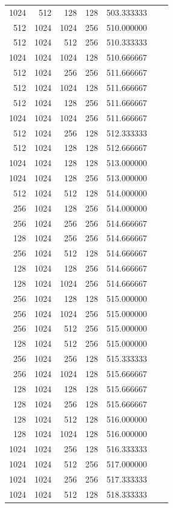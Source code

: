 \documentclass{article}
\begin{document}
{\begin{longtable}{rrrrrrr}
1024 & 512 & 128 & 128 & 503.333333 \\
512 & 1024 & 1024 & 256 & 510.000000 \\
512 & 1024 & 512 & 256 & 510.333333 \\
1024 & 1024 & 1024 & 128 & 510.666667 \\
512 & 1024 & 256 & 256 & 511.666667 \\
512 & 1024 & 1024 & 128 & 511.666667 \\
512 & 1024 & 128 & 256 & 511.666667 \\
1024 & 1024 & 1024 & 256 & 511.666667 \\
512 & 1024 & 256 & 128 & 512.333333 \\
512 & 1024 & 128 & 128 & 512.666667 \\
1024 & 1024 & 128 & 128 & 513.000000 \\
1024 & 1024 & 128 & 256 & 513.000000 \\
512 & 1024 & 512 & 128 & 514.000000 \\
256 & 1024 & 128 & 256 & 514.000000 \\
256 & 1024 & 256 & 256 & 514.666667 \\
128 & 1024 & 256 & 256 & 514.666667 \\
256 & 1024 & 512 & 128 & 514.666667 \\
128 & 1024 & 128 & 256 & 514.666667 \\
128 & 1024 & 1024 & 256 & 514.666667 \\
256 & 1024 & 128 & 128 & 515.000000 \\
256 & 1024 & 1024 & 256 & 515.000000 \\
256 & 1024 & 512 & 256 & 515.000000 \\
128 & 1024 & 512 & 256 & 515.000000 \\
256 & 1024 & 256 & 128 & 515.333333 \\
256 & 1024 & 1024 & 128 & 515.666667 \\
128 & 1024 & 128 & 128 & 515.666667 \\
128 & 1024 & 256 & 128 & 515.666667 \\
128 & 1024 & 512 & 128 & 516.000000 \\
128 & 1024 & 1024 & 128 & 516.000000 \\
1024 & 1024 & 256 & 128 & 516.333333 \\
1024 & 1024 & 512 & 256 & 517.000000 \\
1024 & 1024 & 256 & 256 & 517.333333 \\
1024 & 1024 & 512 & 128 & 518.333333 \\

\end{longtable}}
\end{document}
